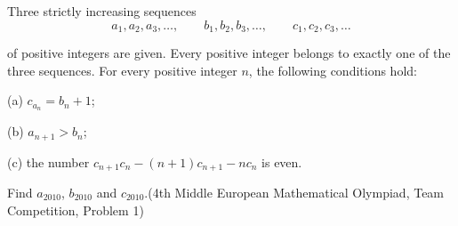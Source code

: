 Three strictly increasing sequences\[a_1, a_2, a_3, \ldots,\qquad b_1, b_2, b_3, \ldots,\qquad c_1, c_2, c_3, \ldots\]

of positive integers are given. Every positive integer belongs to exactly one of the three sequences. For every positive integer $n$,  the following conditions hold:

(a) $c_{a_n}=b_n+1$;

(b) $a_{n+1}>b_n$;

(c) the number $c_{n+1}c_{n}-(n+1)c_{n+1}-nc_n$ is even.

Find $a_{2010}$,  $b_{2010}$ and $c_{2010}$.(4th Middle European Mathematical Olympiad, Team Competition, Problem 1)